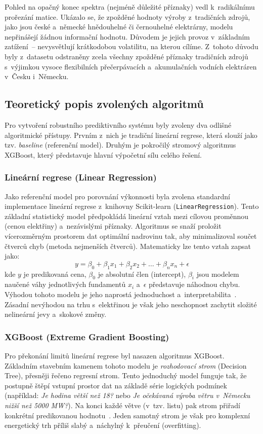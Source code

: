 \documentclass[a4paper]{article}
\begin{document}
Pohled na opačný konec spektra (nejméně důležité příznaky) vedl k~radikálnímu prořezání matice. Ukázalo se, že zpožděné hodnoty výroby z~tradičních zdrojů, jako jsou české a~německé hnědouhelné či černouhelné elektrárny, modelu nepřinášejí žádnou informační hodnotu. Důvodem je jejich provoz v~základním zatížení~-- nevysvětlují krátkodobou volatilitu, na kterou cílíme. Z~tohoto důvodu byly z~datasetu odstraněny zcela všechny zpožděné příznaky tradičních zdrojů s~výjimkou vysoce flexibilních přečerpávacích a~akumulačních vodních elektráren v~Česku i~Německu.

\subsection{Teoretický popis zvolených algoritmů}
Pro vytvoření robustního prediktivního systému byly zvoleny dva odlišné algoritmické přístupy. Prvním z~nich je tradiční lineární regrese, která slouží jako tzv. \textit{baseline} (referenční model). Druhým je pokročilý stromový algoritmus XGBoost, který představuje hlavní výpočetní sílu celého řešení.

\subsubsection{Lineární regrese (Linear Regression)}
Jako referenční model pro porovnání výkonnosti byla zvolena standardní implementace lineární regrese z~knihovny Scikit-learn (\texttt{LinearRegression}). Tento základní statistický model předpokládá lineární vztah mezi cílovou proměnnou (cenou elektřiny) a~nezávislými příznaky. Algoritmus se snaží proložit vícerozměrným prostorem dat optimální nadrovinu tak, aby minimalizoval součet čtverců chyb (metoda nejmenších čtverců). Matematicky lze tento vztah zapsat jako:
$$ y = \beta_0 + \beta_1 x_1 + \beta_2 x_2 + \dots + \beta_n x_n + \epsilon $$
kde $y$ je predikovaná cena, $\beta_0$ je absolutní člen (intercept), $\beta_i$ jsou modelem naučené váhy jednotlivých fundamentů $x_i$ a~$\epsilon$ představuje náhodnou chybu. Výhodou tohoto modelu je jeho naprostá jednoduchost a~interpretabilita~\cite{hands-on-ml}. Zásadní nevýhodou na trhu s~elektřinou je však jeho neschopnost zachytit složité nelineární jevy a~skokové změny.

\subsubsection{XGBoost (Extreme Gradient Boosting)}
\label{subsubsec:xgboost}
Pro překonání limitů lineární regrese byl nasazen algoritmus XGBoost. Základním stavebním kamenem tohoto modelu je \textit{rozhodovací strom} (Decision Tree), přesněji řečeno regresní strom. Tento jednoduchý model funguje tak, že postupně štěpí vstupní prostor dat na základě série logických podmínek (například: \textit{Je hodina větší než 18?} nebo \textit{Je očekávaná výroba větru v~Německu nižší než 5000 MW?}). Na konci každé větve (v~tzv. listu) pak strom přiřadí konkrétní predikovanou hodnotu~\cite{hands-on-ml}. Jeden samotný strom je však pro komplexní energetický trh příliš slabý a~náchylný k~přeučení (overfitting).
\end{document}
